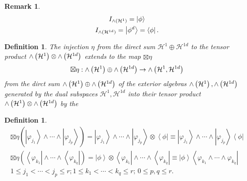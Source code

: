 \documentclass[aps,preprint]{revtex4}%
\newtheorem{definition}[theorem]{Definition}
\newtheorem{remark}[theorem]{Remark}
\begin{document}
\begin{remark}%
\begin{gather}
I_{{\huge \wedge}\left(  \mathcal{H}^{1}\right)  }=\left\vert \phi
\right\rangle \\
I_{{\huge \wedge}\left(  \mathcal{H}^{1d}\right)  }=\left\vert \phi
^{d}\right\rangle =\left\langle \phi\right\vert .
\end{gather}

\end{remark}

\begin{definition}
The injection $\eta$ from the direct sum $\mathcal{H}^{1}\oplus\mathcal{H}%
^{1d}$ to the tensor product ${\huge \wedge}\left(  \mathcal{H}^{1}\right)
\otimes{\huge \wedge}\left(  \mathcal{H}^{1d}\right)  $ extends to the map
$\boxtimes\eta$
\begin{equation}
\boxtimes\eta:{\huge \wedge}\left(  \mathcal{H}^{1}\right)  \oplus
{\huge \wedge}\left(  \mathcal{H}^{1d}\right)  \rightarrow{\huge \wedge
}\left(  \mathcal{H}^{1},\mathcal{H}^{1d}\right)
\end{equation}
from the dirct sum ${\huge \wedge}\left(  \mathcal{H}^{1}\right)
\oplus{\huge \wedge}\left(  \mathcal{H}^{1d}\right)  $ of the exterior
algebras ${\huge \wedge}\left(  \mathcal{H}^{1}\right)  ,{\huge \wedge}\left(
\mathcal{H}^{1d}\right)  $ generated by the dual subspaces $\mathcal{H}%
^{1},\mathcal{H}^{1d}$ into their tensor product ${\huge \wedge}\left(
\mathcal{H}^{1}\right)  \otimes{\huge \wedge}\left(  \mathcal{H}^{1d}\right)
$ by the
\end{definition}

\begin{definition}%
\begin{gather}
\boxtimes\eta\left(  \left\vert \varphi_{j_{1}}\right\rangle \wedge
\cdots\wedge\left\vert \varphi_{j_{p}}\right\rangle \right)  =\left\vert
\varphi_{j_{1}}\right\rangle \wedge\cdots\wedge\left\vert \varphi_{j_{p}%
}\right\rangle \otimes\left\langle \phi\right\vert \equiv\left\vert
\varphi_{j_{1}}\right\rangle \wedge\cdots\wedge\left\vert \varphi_{j_{p}%
}\right\rangle \left\langle \phi\right\vert \\
\boxtimes\eta\left(  \left\langle \varphi_{k_{1}}\right\vert \wedge
\cdots\wedge\left\langle \varphi_{k_{q}}\right\vert \right)  =\left\vert
\phi\right\rangle \otimes\left\langle \varphi_{k_{1}}\right\vert \wedge
\cdots\wedge\left\langle \varphi_{k_{q}}\right\vert \equiv\left\vert
\phi\right\rangle \left\langle \varphi_{k_{1}}\wedge\cdots\wedge\varphi
_{k_{q}}\right\vert \\
1\leq j_{1}<\cdots<j_{p}\leq r;1\leq k_{1}<\cdots<k_{q}\leq r;\,0\leq p,q\leq
r.
\end{gather}

\end{definition}
\end{document}
